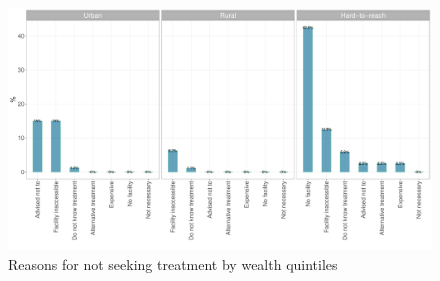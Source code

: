\documentclass[12pt,a4paper]{article}
\begin{document}
\begin{figure}[H]

{\centering \includegraphics{kayahReport_files/figure-latex/ari4plot-1} 

}

\caption{Reasons for not seeking treatment by wealth quintiles}\label{fig:ari4plot}
\end{figure}
\end{document}

